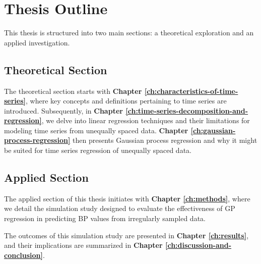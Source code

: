 \section{Thesis Outline}

This thesis is structured into two main sections: a theoretical exploration and
an applied investigation.

\subsection{Theoretical Section}

The theoretical section starts with \textbf{Chapter \ref{ch:characteristics-of-time-series}},
where key concepts and definitions pertaining to time series are introduced.
Subsequently, in \textbf{Chapter \ref{ch:time-series-decomposition-and-regression}},
we delve into linear regression techniques and their limitations
for modeling time series from unequally spaced data.
\textbf{Chapter \ref{ch:gaussian-process-regression}} then presents Gaussian process
regression and why it might be suited for time series regression of unequally spaced data.

\subsection{Applied Section}

The applied section of this thesis initiates with \textbf{Chapter \ref{ch:methods}},
where we detail the simulation study designed to evaluate the effectiveness
of GP regression in predicting BP values from irregularly sampled data.

The outcomes of this simulation study are presented in
\textbf{Chapter \ref{ch:results}}, and their implications are
summarized in \textbf{Chapter \ref{ch:discussion-and-conclusion}}.

